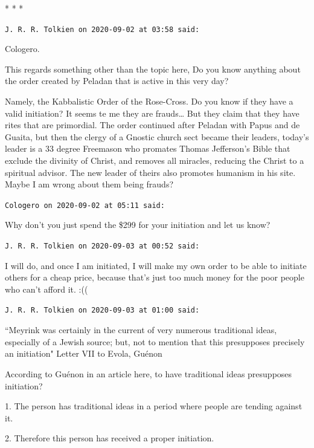 \begin{center}* * *\end{center}

\begin{footnotesize}\begin{sffamily}



\texttt{J. R. R. Tolkien on 2020-09-02 at 03:58 said: }

Cologero.

This regards something other than the topic here, Do you know anything about the order created by Peladan that is active in this very day?

Namely, the Kabbalistic Order of the Rose-Cross. Do you know if they have a valid initiation? It seems te me they are frauds… But they claim that they have rites that are primordial. The order continued after Peladan with Papus and de Guaita, but then the clergy of a Gnostic church sect became their leaders, today's leader is a 33 degree Freemason who promates Thomas Jefferson's Bible that exclude the divinity of Christ, and removes all miracles, reducing the Christ to a spiritual advisor. The new leader of theirs also promotes humanism in his site. Maybe I am wrong about them being frauds?


\hfill

\texttt{Cologero on 2020-09-02 at 05:11 said: }

Why don't you just spend the \$299 for your initiation and let us know?


\hfill

\texttt{J. R. R. Tolkien on 2020-09-03 at 00:52 said: }

I will do, and once I am initiated, I will make my own order to be able to initiate others for a cheap price, because that's just too much money for the poor people who can't afford it. :((


\hfill

\texttt{J. R. R. Tolkien on 2020-09-03 at 01:00 said: }

``Meyrink was certainly in the current of very numerous traditional ideas, especially of a Jewish source; but, not to mention that this presupposes precisely an initiation" Letter VII to Evola, Guénon

According to Guénon in an article here, to have traditional ideas presupposes initiation? 

1. The person has traditional ideas in a period where people are tending against it.

2. Therefore this person has received a proper initiation.


\end{sffamily}
\end{footnotesize}

